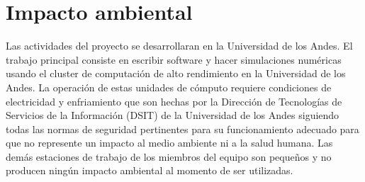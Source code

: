 
\section{Impacto ambiental}

Las actividades del proyecto se desarrollaran en la Universidad de los Andes. El trabajo principal 
consiste en escribir software y hacer simulaciones num\'ericas usando el cluster de computaci\'on de
alto rendimiento en la Universidad de los Andes. La operaci\'on de estas unidades de c\'omputo 
requiere condiciones de electricidad y enfriamiento que son hechas por la Direcci\'on  de Tecnolog\'ias de 
Servicios de la Informaci\'on (DSIT) de la Universidad de los Andes siguiendo todas las normas de seguridad pertinentes
para su funcionamiento adecuado para que no represente un impacto al medio ambiente ni a la salud humana. Las dem\'as estaciones de trabajo de los miembros del equipo son peque\~nos y no producen ning\'un impacto ambiental al momento de ser utilizadas.
